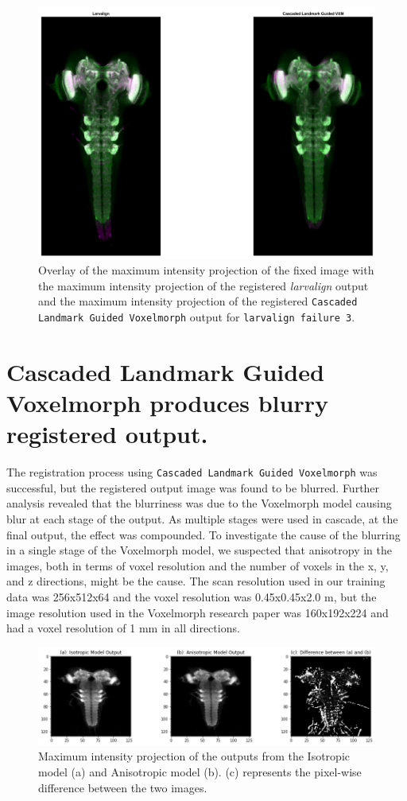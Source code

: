 \documentclass{book}
\begin{document}
	\begin{figure}[h!]
		\centering
		\includegraphics[width=0.7\columnwidth]{resources/chapter7/LRE_Visual/60a07.png}
		\caption{Overlay of the maximum intensity projection of the fixed image with the maximum intensity projection of the registered \textit{larvalign} output and the maximum intensity projection of the registered \texttt{Cascaded Landmark Guided Voxelmorph} output for \texttt{larvalign failure 3}.}
		\label{fig:larvalign failure 3}
	\end{figure}
	
	\section{Cascaded Landmark Guided Voxelmorph produces blurry registered output.}
	The registration process using \texttt{Cascaded Landmark Guided Voxelmorph} was successful, but the registered output image was found to be blurred. Further analysis revealed that the blurriness was due to the Voxelmorph model causing blur at each stage of the output. As multiple stages were used in cascade, at the final output, the effect was compounded. To investigate the cause of the blurring in a single stage of the Voxelmorph model, we suspected that anisotropy in the images, both in terms of voxel resolution and the number of voxels in the x, y, and z directions, might be the cause. The scan resolution used in our training data was 256x512x64 and the voxel resolution was 0.45x0.45x2.0 \textmu m, but the image resolution used in the Voxelmorph research paper was 160x192x224 and had a voxel resolution of 1 mm in all directions.
	
	\begin{figure}[H]
		\centering
		\includegraphics[width=0.7\columnwidth]{resources/discussion/anisotropic_effect/Result_1.png}
		\caption{Maximum intensity projection of the outputs from the Isotropic model (a) and Anisotropic model (b). (c) represents the pixel-wise difference between the two images.}
		\label{fig:anisotropisum_result1}
	\end{figure}
\end{document}
